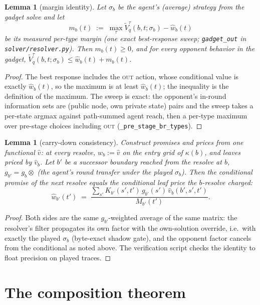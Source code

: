 \documentclass[11pt]{article}
\theoremstyle{plain}
\newtheorem{lemma}[theorem]{Lemma}
\theoremstyle{definition}
\theoremstyle{remark}
\begin{document}
\begin{lemma}[margin identity]\label{lem:margin}
Let $\sigma_b$ be the agent's (average) strategy from the gadget solve
and let
\[
m_b(t) \;:=\; \max_{\tau} \tilde V^{\tau}_q(b,t;\sigma_b) - \hat w_b(t)
\]
be its measured per-type margin (one exact best-response sweep;
\texttt{gadget\_out} in \texttt{solver/resolver.py}). Then $m_b(t)\ge 0$,
and for every opponent behavior in the gadget,
$\tilde V^{\tau}_q(b,t;\sigma_b) \le \hat w_b(t) + m_b(t)$.
\end{lemma}

\begin{proof}
The best response includes the \textsc{out} action, whose conditional
value is exactly $\hat w_b(t)$, so the maximum is at least
$\hat w_b(t)$; the inequality is the definition of the maximum. The
sweep is exact: the opponent's in-round information sets are (public
node, own private state) pairs and the sweep takes a per-state argmax
against path-summed agent reach, then a per-type maximum over
pre-stage choices including \textsc{out}
(\texttt{\_pre\_stage\_br\_types}).
\end{proof}

\begin{lemma}[carry-down consistency]\label{lem:carry}
Construct promises and prices from one functional $\hat v$: at every
resolve, $w_b := \hat v$ on the entry grid of $\kappa(b)$, and leaves
priced by $\hat v_b$. Let $b'$ be a successor boundary reached from
the resolve at $b$, $g_{b'} = g_b \otimes$ (the agent's round transfer
under the \emph{played} $\sigma_b$). Then the conditional promise of
the next resolve equals the conditional leaf price the $b$-resolve
charged:
\[
\hat w_{b'}(t') \;=\;
\frac{\sum_{s'} K_{b'}(s',t')\, g_{b'}(s')\, \hat v_b(b',s',t')}{M_{b'}(t')} .
\]
\end{lemma}

\begin{proof}
Both sides are the same $g_{b'}$-weighted average of the same matrix:
the resolver's filter propagates its own factor with the
own-solution override, i.e.\ with exactly the played $\sigma_b$
(byte-exact shadow gate), and the opponent factor cancels from the
conditional as noted above. The verification script checks the
identity to float precision on played traces.
\end{proof}

\section{The composition theorem}
\end{document}
